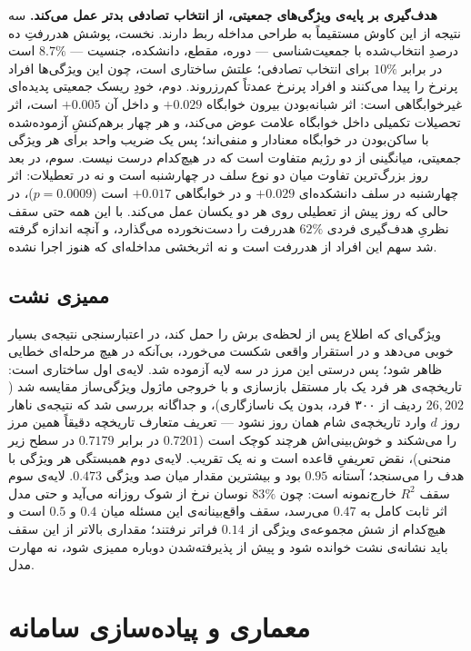 \textbf{هدف‌گیری بر پایه‌ی ویژگی‌های جمعیتی، از انتخاب تصادفی بدتر عمل می‌کند.} سه نتیجه
از این کاوش مستقیماً به طراحی مداخله ربط دارند. نخست، پوشش هدررفتِ ده درصدِ انتخاب‌شده با
جمعیت‌شناسی — دوره، مقطع، دانشکده، جنسیت — $8.7\%$ است در برابر $10\%$ برای انتخاب
تصادفی؛ علتش ساختاری است، چون این ویژگی‌ها افراد پرنرخ را پیدا می‌کنند و افراد پرنرخ
عمدتاً کم‌رزروند. دوم، خودِ ریسک جمعیتی پدیده‌ای غیرخوابگاهی است: اثر شبانه‌بودن بیرون
خوابگاه $+0.029$ و داخل آن $+0.005$ است، اثر تحصیلات تکمیلی داخل خوابگاه علامت عوض
می‌کند، و هر چهار برهم‌کنشِ آزموده‌شده با ساکن‌بودن در خوابگاه معنادار و منفی‌اند؛ پس یک
ضریب واحد برای هر ویژگی جمعیتی، میانگینی از دو رژیم متفاوت است که در هیچ‌کدام درست نیست.
سوم، در بعد روز بزرگ‌ترین تفاوت میان دو نوع سلف در چهارشنبه است و نه در تعطیلات: اثر
چهارشنبه در سلف دانشکده‌ای $+0.029$ و در خوابگاهی $+0.017$ است ($p = 0.0009$)، در حالی
که روز پیش از تعطیلی روی هر دو یکسان عمل می‌کند. با این همه حتی سقف نظریِ هدف‌گیری فردی
$62\%$ هدررفت را دست‌نخورده می‌گذارد، و آنچه اندازه گرفته شد سهم این افراد از هدررفت است
و نه اثربخشی مداخله‌ای که هنوز اجرا نشده.

\subsection{ممیزی نشت}
\label{sec:3-3-4}

ویژگی‌ای که اطلاع پس از لحظه‌ی برش را حمل کند، در اعتبارسنجی نتیجه‌ی بسیار خوبی می‌دهد و
در استقرار واقعی شکست می‌خورد، بی‌آنکه در هیچ مرحله‌ای خطایی ظاهر شود؛ پس درستی این مرز
در سه لایه آزموده شد. لایه‌ی اول ساختاری است: تاریخچه‌ی هر فرد یک بار مستقل بازسازی و با
خروجی ماژول ویژگی‌ساز مقایسه شد ($26{,}202$ ردیف از ۳۰۰ فرد، بدون یک ناسازگاری)، و
جداگانه بررسی شد که نتیجه‌ی ناهار روز $d$ وارد تاریخچه‌ی شام همان روز نشود — تعریف
متعارف تاریخچه دقیقاً همین مرز را می‌شکند و خوش‌بینی‌اش هرچند کوچک است ($0.7201$ در برابر
$0.7179$ در سطح زیر منحنی)، نقض تعریفیِ قاعده است و نه یک تقریب. لایه‌ی دوم همبستگی هر
ویژگی با هدف را می‌سنجد؛ آستانه $0.95$ بود و بیشترین مقدار میان صد ویژگی $0.473$. لایه‌ی
سوم سقف $R^2$ خارج‌نمونه است: چون $83\%$ نوسان نرخ از شوک روزانه می‌آید و حتی مدل اثر
ثابت کامل به $0.47$ می‌رسد، سقف واقع‌بینانه‌ی این مسئله میان $0.4$ و $0.5$ است و هیچ‌کدام
از شش مجموعه‌ی ویژگی از $0.14$ فراتر نرفتند؛ مقداری بالاتر از این سقف باید نشانه‌ی نشت
خوانده شود و پیش از پذیرفته‌شدن دوباره ممیزی شود، نه مهارت مدل.

\section{معماری و پیاده‌سازی سامانه}
\label{sec:3-4}

